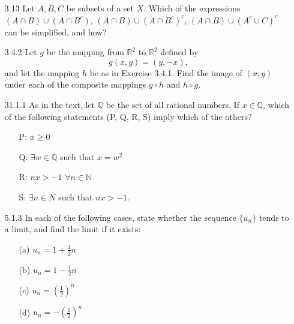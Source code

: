 \documentclass[12pt]{article}
\begin{document}
\begin{itemize}

\item[3.13] Let $A, B, C$ be subsets of a set $X$.  Which of the expressions $(A\cap B)\cup (A\cap B^c)$, $(A\cap B)\cup (A\cap B^c)^c$, $(A\cap B)\cup (A^c\cup C)^c$ can be simplified, and how?



\item[3.4.2] Let $g$ be the mapping from $\mathbb{R}^2$ to $\mathbb{R}^2$ defined by $$g(x, y)=(y, -x),$$ and let the mapping $h$ be as in Exercise 3.4.1.  Find the image of $(x, y)$ under each of the composite mappings $g\circ h$ and $h\circ g$.


\item[31.1.1] As in the text, let $\mathbb{Q}$ be the set of all rational numbers. If $x\in \mathbb{Q}$, which of the following statements (P, Q, R, S) imply which of the others?

\begin{itemize}

\item[P:] $x\geq 0$
\item[Q:] $\exists w\in \mathbb{Q} $ such that $x=w^2$
\item[R:] $nx>-1$ $\forall n\in \mathbb{N}$
\item[S:] $\exists n\in N$ such that $nx>-1$.

\end{itemize}

\item[5.1.3] In each of the following cases, state whether the sequence $\{u_n\}$ tends to a limit, and find the limit if it exists:

\begin{itemize}
\item[(a)] $u_n=1+\frac{1}{2}n$
\item[(b)] $u_n=1-\frac{1}{2}n$
\item[(c)] $u_n=(\frac{1}{2})^n$
\item[(d)] $u_n=-(\frac{1}{2})^n$
\end{itemize}

\end{itemize}
\end{document}
